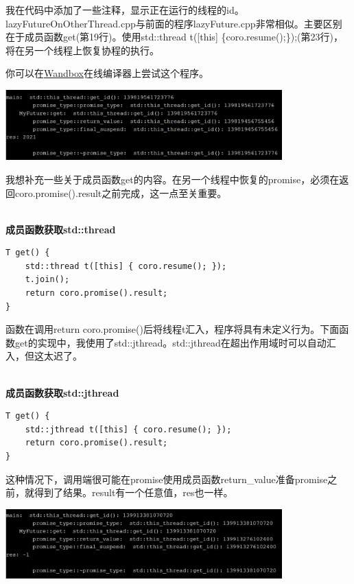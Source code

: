 我在代码中添加了一些注释，显示正在运行的线程的id。lazyFutureOnOtherThread.cpp与前面的程序lazyFuture.cpp非常相似。主要区别在于成员函数get(第19行)。使用std::thread t([this] \{coro.resume();\});(第23行)，将在另一个线程上恢复协程的执行。

你可以在\href{https://wandbox.org/permlink/jFVVj80Gxu6bnNkc}{Wandbox}在线编译器上尝试这个程序。

\begin{center}
\includegraphics[width=0.8\textwidth]{content/3/chapter7/images/11.png}\\
\end{center}

我想补充一些关于成员函数get的内容。在另一个线程中恢复的promise，必须在返回coro.promise().result之前完成，这一点至关重要。

\hspace*{\fill} \\ %
\noindent
\textbf{成员函数获取std::thread}
\begin{lstlisting}[style=styleCXX]
T get() {
	std::thread t([this] { coro.resume(); });
	t.join();
	return coro.promise().result;
}
\end{lstlisting}

函数在调用return coro.promise()后将线程t汇入，程序将具有未定义行为。下面函数get的实现中，我使用了std::jthread。std::jthread在超出作用域时可以自动汇入，但这太迟了。

\hspace*{\fill} \\ %
\noindent
\textbf{成员函数获取std::jthread}
\begin{lstlisting}[style=styleCXX]
T get() {
	std::jthread t([this] { coro.resume(); });
	return coro.promise().result;
}
\end{lstlisting}

这种情况下，调用端很可能在promise使用成员函数return\_value准备promise之前，就得到了结果。result有一个任意值，res也一样。

\begin{center}
\includegraphics[width=0.8\textwidth]{content/3/chapter7/images/12.png}\\
\end{center}

